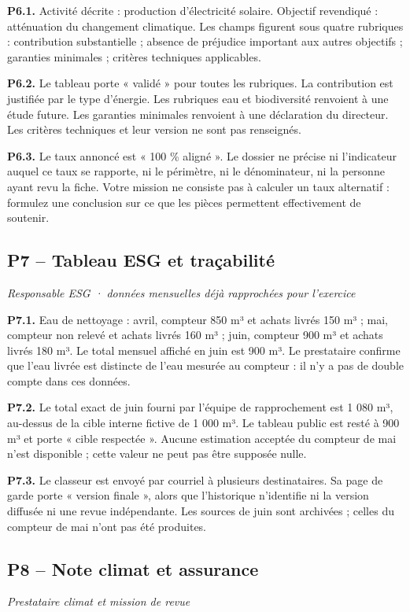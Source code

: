 \documentclass[11pt,a4paper]{article}
\begin{document}
\textbf{P6.1.} Activité décrite : production d’électricité solaire. Objectif revendiqué : atténuation du changement climatique. Les champs figurent sous quatre rubriques : contribution substantielle ; absence de préjudice important aux autres objectifs ; garanties minimales ; critères techniques applicables.

\textbf{P6.2.} Le tableau porte « validé » pour toutes les rubriques. La contribution est justifiée par le type d’énergie. Les rubriques eau et biodiversité renvoient à une étude future. Les garanties minimales renvoient à une déclaration du directeur. Les critères techniques et leur version ne sont pas renseignés.

\textbf{P6.3.} Le taux annoncé est « 100 \% aligné ». Le dossier ne précise ni l’indicateur auquel ce taux se rapporte, ni le périmètre, ni le dénominateur, ni la personne ayant revu la fiche. Votre mission ne consiste pas à calculer un taux alternatif : formulez une conclusion sur ce que les pièces permettent effectivement de soutenir.

\subsection{P7 -- Tableau ESG et traçabilité}
\textit{Responsable ESG · données mensuelles déjà rapprochées pour l’exercice}

\textbf{P7.1.} Eau de nettoyage : avril, compteur 850 m³ et achats livrés 150 m³ ; mai, compteur non relevé et achats livrés 160 m³ ; juin, compteur 900 m³ et achats livrés 180 m³. Le total mensuel affiché en juin est 900 m³. Le prestataire confirme que l’eau livrée est distincte de l’eau mesurée au compteur : il n’y a pas de double compte dans ces données.

\textbf{P7.2.} Le total exact de juin fourni par l’équipe de rapprochement est 1 080 m³, au-dessus de la cible interne fictive de 1 000 m³. Le tableau public est resté à 900 m³ et porte « cible respectée ». Aucune estimation acceptée du compteur de mai n’est disponible ; cette valeur ne peut pas être supposée nulle.

\textbf{P7.3.} Le classeur est envoyé par courriel à plusieurs destinataires. Sa page de garde porte « version finale », alors que l’historique n’identifie ni la version diffusée ni une revue indépendante. Les sources de juin sont archivées ; celles du compteur de mai n’ont pas été produites.

\subsection{P8 -- Note climat et assurance}
\textit{Prestataire climat et mission de revue}
\end{document}
